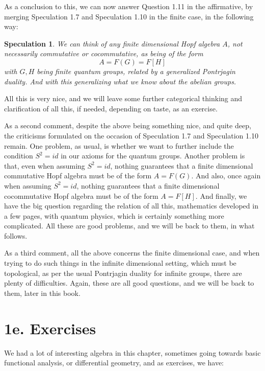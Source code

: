 \documentclass[12pt]{amsbook}
\newtheorem{speculation}[theorem]{Speculation}
\begin{document}
As a conclusion to this, we can now answer Question 1.11 in the affirmative, by merging Speculation 1.7 and Speculation 1.10 in the finite case, in the following way:

\begin{speculation}
We can think of any finite dimensional Hopf algebra $A$, not necessarily commutative or cocommutative, as being of the form
$$A=F(G)=F[H]$$
with $G,H$ being finite quantum groups, related by a generalized Pontrjagin duality. And with this generalizing what we know about the abelian groups.
\end{speculation}

All this is very nice, and we will leave some further categorical thinking and clarification of all this, if needed, depending on taste, as an exercise.

\bigskip

As a second comment, despite the above being something nice, and quite deep, the criticisms formulated on the occasion of Speculation 1.7 and Speculation 1.10 remain. One problem, as usual, is whether we want to further include the condition $S^2=id$ in our axioms for the quantum groups. Another problem is that, even when assuming $S^2=id$, nothing guarantees that a finite dimensional commutative Hopf algebra must be of the form $A=F(G)$. And also, once again when assuming $S^2=id$, nothing guarantees that a finite dimensional cocommutative Hopf algebra must be of the form $A=F[H]$. And finally, we have the big question regarding the relation of all this, mathematics developed in a few pages, with quantum physics, which is certainly something more complicated. All these are good problems, and we will be back to them, in what follows.

\bigskip

As a third comment, all the above concerns the finite dimensional case, and when trying to do such things in the infinite dimensional setting, which must be topological, as per the usual Pontrjagin duality for infinite groups, there are plenty of difficulties. Again, these are all good questions, and we will be back to them, later in this book.

\section*{1e. Exercises}

We had a lot of interesting algebra in this chapter, sometimes going towards basic functional analysis, or differential geometry, and as exercises, we have:
\end{document}
